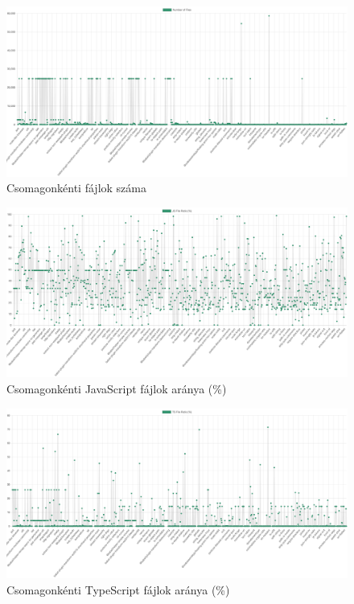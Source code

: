 \begin{figure}[!h]
	\centering
	\includegraphics[scale=0.12]{images/numoffiles.png}
	\caption{Csomagonkénti fájlok száma}
	\label{fig:numoffiles}
\end{figure}

\begin{figure}[!h]
	\centering
	\includegraphics[scale=0.12]{images/jsratio.png}
	\caption{Csomagonkénti JavaScript fájlok aránya (\%)}
	\label{fig:jsratio}
\end{figure}

\begin{figure}[!h]
	\centering
	\includegraphics[scale=0.12]{images/tsratio.png}
	\caption{Csomagonkénti TypeScript fájlok aránya (\%)}
	\label{fig:tsratio}
\end{figure}

